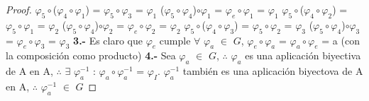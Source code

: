 \documentclass[10pt,a4paper,oneside]{article}
\begin{document}
\begin{proof}
				$\varphi_{5}\circ$($\varphi_{4}\circ\varphi_{1}$) = $\varphi_{5}\circ\varphi_{3}$ = $\varphi_{1}$
				\newline
				($\varphi_{5}\circ\varphi_{4}$)$\circ\varphi_{1}$ = $\varphi_{e}\circ\varphi_{1}$ = $\varphi_{1}$
				\newline
				\newline
				$\varphi_{5}\circ$($\varphi_{4}\circ\varphi_{2}$) = $\varphi_{5}\circ\varphi_{1}$ = $\varphi_{2}$
				\newline
				($\varphi_{5}\circ\varphi_{4}$)$\circ\varphi_{2}$ = $\varphi_{e}\circ\varphi_{2}$ = $\varphi_{2}$
				\newline
				\newline
				$\varphi_{5}\circ$($\varphi_{4}\circ\varphi_{3}$) = $\varphi_{5}\circ\varphi_{2}$ = $\varphi_{3}$
				\newline
				($\varphi_{5}\circ\varphi_{4}$)$\circ\varphi_{3}$ = $\varphi_{e}\circ\varphi_{3}$ = $\varphi_{3}$
				\newline
				\newline
				\textbf{3.-}
				Es claro que $\varphi_{e}$ cumple $\forall$ $\varphi_{a}$ $\in$ $G$, $\varphi_{e}\circ\varphi_{a}$ = $\varphi_{a}\circ\varphi_{e}$ = a (con la composición como producto)
				\newline
				\newline
				\textbf{4.-}
				Sea $\varphi_{a}$ $\in$ $G$, $\therefore$ $\varphi_{a}$ es una aplicación biyectiva de A en A, $\therefore$ $\exists$ $\varphi_{a}^{-1}$ : $\varphi_{a}\circ\varphi_{a}^{-1}$ = $\varphi_{I}$. $\varphi_{a}^{-1}$ también es una aplicación biyectova de A en A, $\therefore$ $\varphi_{a}^{-1}$ $\in$ $G$
				\newline
			\end{proof}
\end{document}
